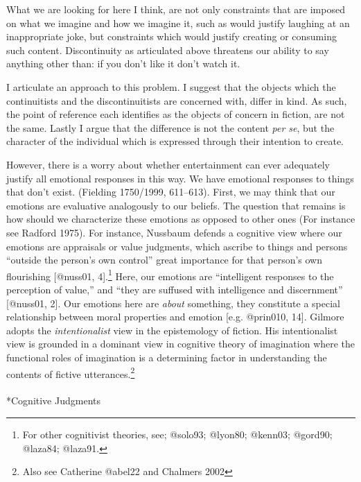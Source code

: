 \documentclass[
  letterpaper,
  DIV=11,
  numbers=noendperiod]{scrartcl}
\makeatletter
\let\oldparagraph\paragraph
\renewcommand{\paragraph}{
    \@ifstar
      \xxxParagraphStar
      \xxxParagraphNoStar
  }
\newcommand{\xxxParagraphStar}[1]{\oldparagraph*{#1}\mbox{}}
\newcommand{\xxxParagraphNoStar}[1]{\oldparagraph{#1}\mbox{}}
\theoremstyle{remark}
\makeatother
\begin{document}
What we are looking for here I think, are not only constraints that are
imposed on what we imagine and how we imagine it, such as would justify
laughing at an inappropriate joke, but constraints which would justify
creating or consuming such content. Discontinuity as articulated above
threatens our ability to say anything other than: if you don't like it
don't watch it.

I articulate an approach to this problem. I suggest that the objects
which the continuitists and the discontinuitists are concerned with,
differ in kind. As such, the point of reference each identifies as the
objects of concern in fiction, are not the same. Lastly I argue that the
difference is not the content \emph{per se}, but the character of the
individual which is expressed through their intention to create.

However, there is a worry about whether entertainment can ever
adequately justify all emotional responses in this way. We have
emotional responses to things that don't exist. (Fielding 1750/1999,
611--613). First, we may think that our emotions are evaluative
analogously to our beliefs. The question that remains is how should we
characterize these emotions as opposed to other ones (For instance see
Radford 1975). For instance, Nussbaum defends a cognitive view where our
emotions are appraisals or value judgments, which ascribe to things and
persons ``outside the person's own control'' great importance for that
person's own flourishing {[}@nuss01, 4{]}.\footnote{For other
  cognitivist theories, see; @solo93; @lyon80; @kenn03; @gord90;
  @laza84; @laza91.} Here, our emotions are ``intelligent responses to
the perception of value,'' and ``they are suffused with intelligence and
discernment'' {[}@nuss01, 2{]}. Our emotions here are \emph{about}
something, they constitute a special relationship between moral
properties and emotion {[}e.g. @prin010, 14{]}. Gilmore adopts the
\emph{intentionalist} view in the epistemology of fiction. His
intentionalist view is grounded in a dominant view in cognitive theory
of imagination where the functional roles of imagination is a
determining factor in understanding the contents of fictive
utterances.\footnote{Also see Catherine @abel22 and Chalmers 2002}

\paragraph*{Cognitive Judgments}\label{cognitive-judgments}
\end{document}
